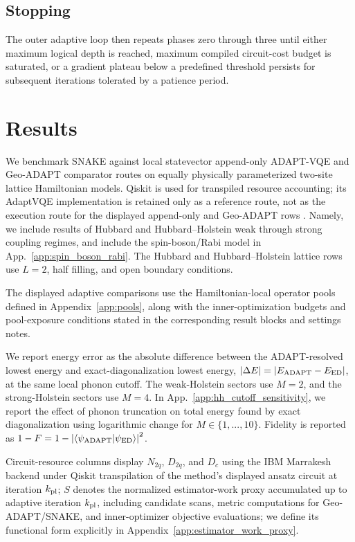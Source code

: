 \documentclass[
  reprint,
  amsmath,
  amssymb,
  aps,
  pra,
  nofootinbib,
  superscriptaddress,
  floatfix
]{revtex4-2}
\newcommand{\braket}[2]{\langle #1|#2\rangle}
\begin{document}
\subsection{Stopping}
The outer adaptive loop then repeats phases zero through three until either maximum logical depth is reached, maximum compiled circuit-cost budget is saturated, or a gradient plateau below a predefined threshold persists for subsequent iterations tolerated by a patience period.


\section{Results}
\label{sec:results}
\label{sec:benchmarks}

We benchmark SNAKE against local statevector append-only ADAPT-VQE and Geo-ADAPT comparator routes on equally physically parameterized two-site lattice Hamiltonian models. Qiskit is used for transpiled resource accounting; its AdaptVQE implementation is retained only as a reference route, not as the execution route for the displayed append-only and Geo-ADAPT rows \cite{JavadiAbhari2024Qiskit,QiskitAlgorithmsAdaptVQE}. Namely, we include results of Hubbard and Hubbard--Holstein weak through strong coupling regimes, and include the spin-boson/Rabi model in App.~\ref{app:spin_boson_rabi}. The Hubbard and Hubbard--Holstein lattice rows use \(L=2\), half filling, and open boundary conditions.

The displayed adaptive comparisons use the Hamiltonian-local operator pools defined in Appendix~\ref{app:pools}, along with the inner-optimization budgets and pool-exposure conditions stated in the corresponding result blocks and settings notes.

We report energy error as the absolute difference between the ADAPT-resolved lowest energy and exact-diagonalization lowest energy, \(|\Delta E|=|E_{\rm ADAPT}-E_{\rm ED}|\), at the same local phonon cutoff. The weak-Holstein sectors use \(M=2\), and the strong-Holstein sectors use \(M=4\).
In App.~\ref{app:hh_cutoff_sensitivity}, we report the effect of phonon truncation on total energy found by exact diagonalization using logarithmic change for $M\in\{1,...,10\}.$ Fidelity is reported as \(1-F=1-\left|\braket{\psi_{\rm ADAPT}}{\psi_{\rm ED}}\right|^2\).

Circuit-resource columns display \(N_{2q}\), \(D_{2q}\), and \(D_c\) using the IBM Marrakesh backend under Qiskit transpilation of the method's displayed ansatz circuit at iteration $k_{\rm{pl}}$; \(S\) denotes the normalized estimator-work proxy accumulated up to adaptive iteration $k_{\rm{pl}}$, including candidate scans, metric computations for Geo-ADAPT/SNAKE, and inner-optimizer objective evaluations; we define its functional form explicitly in Appendix~\ref{app:estimator_work_proxy}.
\end{document}
